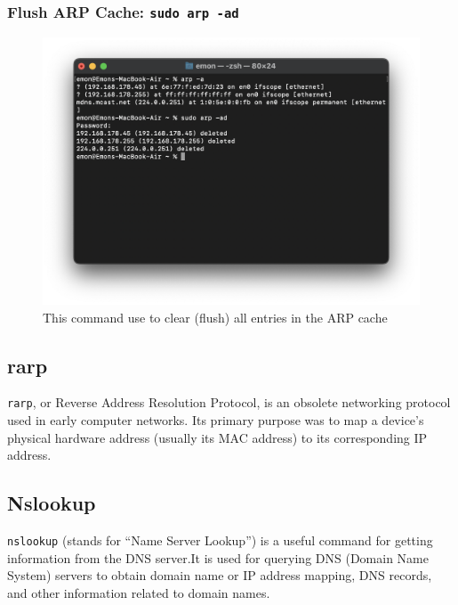 \documentclass[11pt]{article}
\newcommand{\terminal}[1]{\texttt{\color{terminalcolor}#1}}
\begin{document}
\newpage

\subsubsection{Flush ARP Cache: \terminal{sudo arp -ad}}
\begin{figure}[!h]
    \centering
    \includegraphics[width=\textwidth]{arp2.png}
    \caption{This command use to clear (flush) all entries in the ARP cache}
\end{figure}

\subsection{rarp}
\terminal{rarp}, or Reverse Address Resolution Protocol, is an obsolete networking protocol used in early computer networks. Its primary purpose was to map a device's physical hardware address (usually its MAC address) to its corresponding IP address.

\newpage


\subsection{Nslookup}
\terminal{nslookup} (stands for “Name Server Lookup”) is a useful command for getting information from the DNS server.It is used for querying DNS (Domain Name System) servers to obtain domain name or IP address mapping, DNS records, and other information related to domain names.
\end{document}
